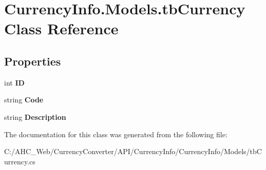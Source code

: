 \hypertarget{class_currency_info_1_1_models_1_1tb_currency}{\section{Currency\-Info.\-Models.\-tb\-Currency Class Reference}
\label{class_currency_info_1_1_models_1_1tb_currency}
}
\subsection*{Properties}
\begin{DoxyCompactItemize}
\item 
\hypertarget{class_currency_info_1_1_models_1_1tb_currency_aa62f6a80797e6c157538af9868357ebe}{int {\bfseries I\-D}}\label{class_currency_info_1_1_models_1_1tb_currency_aa62f6a80797e6c157538af9868357ebe}

\item 
\hypertarget{class_currency_info_1_1_models_1_1tb_currency_a4ff9f4fddfb542175c9f1813c2375c55}{string {\bfseries Code}}\label{class_currency_info_1_1_models_1_1tb_currency_a4ff9f4fddfb542175c9f1813c2375c55}

\item 
\hypertarget{class_currency_info_1_1_models_1_1tb_currency_acd551de6d8a46dcbd1253911af1f28bc}{string {\bfseries Description}}\label{class_currency_info_1_1_models_1_1tb_currency_acd551de6d8a46dcbd1253911af1f28bc}

\end{DoxyCompactItemize}


The documentation for this class was generated from the following file\-:\begin{DoxyCompactItemize}
\item 
C\-:/\-A\-H\-C\-\_\-\-Web/\-Currency\-Converter/\-A\-P\-I/\-Currency\-Info/\-Currency\-Info/\-Models/tb\-Currency.\-cs\end{DoxyCompactItemize}
